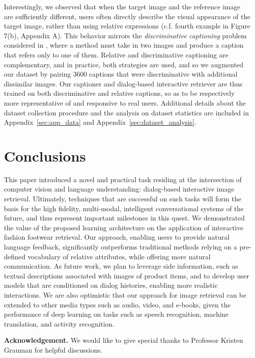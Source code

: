 \documentclass{article}
\begin{document}
Interestingly, we observed that when the target image and the reference image are sufficiently different, users often directly describe the visual appearance of the target image, rather than using relative expressions (c.f. fourth example in Figure 7(b), Appendix A). This behavior mirrors the \emph{discriminative captioning} problem considered in \cite{vedantam2017}, where a method must take in two images and produce a caption that refers only to one of them. Relative and discriminative captioning are complementary, and in practice, both strategies are used, and so we augmented our dataset by pairing 3600 captions that were discriminative with additional dissimilar images. Our captioner and dialog-based interactive retriever are thus trained on both discriminative and relative captions, so as to be respectively more representative of and responsive to real users. Additional details about the dataset collection procedure and the analysis on dataset statistics are included in Appendix~\ref{sec:app_data} and Appendix~\ref{sec:dataset_analysis}.


\section{Conclusions}
This paper introduced a novel and practical task residing at the intersection 
of computer vision and language understanding: %
dialog-based
interactive image retrieval.
Ultimately, techniques that are successful on such tasks will form the basis 
for the high fidelity,  multi-modal, intelligent 
conversational systems of the future, and thus represent important milestones in this quest.  
We demonstrated the value of %
the proposed learning architecture on the application
of interactive fashion footwear retrieval.
Our approach, 
enabling users to provide natural language feedback,
significantly outperforms
traditional methods relying on a pre-defined vocabulary of relative attributes, while offering more natural communication.
As future work, we plan to leverage side information, such as textual descriptions associated with images of product items,
and to develop user models that are
conditioned on dialog histories, enabling more realistic interactions.
We are also optimistic that our approach for image retrieval can be extended to other media types such as audio, video, and e-books, given the 
performance of deep learning on tasks such as speech recognition, machine translation, and activity recognition. 


\textbf{Acknowledgement.}
We would like to give special thanks to Professor Kristen Grauman for helpful discussions. 


\begingroup
   	\small
    
	
\endgroup

% 
% 


\end{document}
